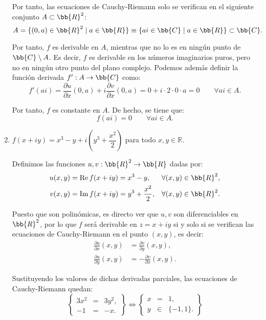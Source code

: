 \begin{ejercicio}
\begin{enumerate}
        Por tanto, las ecuaciones de Cauchy-Riemann solo se verifican en el siguiente conjunto $A\subset \bb{R}^2$:
        \[
            A = \{(0,a)\in\bb{R}^2\mid a\in\bb{R}\}\equiv
            \{ai\in\bb{C}\mid a\in\bb{R}\}\subset \bb{C}.
        \]
        
        Por tanto, $f$ es derivable en $A$, mientras que no lo es en ningún punto de $\bb{C}\setminus A$. Es decir, $f$ es derivable en los números imaginarios puros, pero no en ningún otro punto del plano complejo.
        Podemos además definir la función derivada $f':A\to\bb{C}$ como:
        \[
            f'(ai) = \dfrac{\partial u}{\partial x}(0,a) + i\dfrac{\partial v}{\partial x}(0,a) = 0+i\cdot 2\cdot 0 \cdot a = 0\qquad \forall ai\in A.
        \]

        Por tanto, $f$ es constante en $A$. De hecho, se tiene que:
        \[
            f(ai) = 0\qquad \forall ai\in A.
        \]



        \item $f(x + iy) = x^3 - y + i\left(y^3 + \dfrac{x^2}{2}\right)$ para todo $x, y \in \mathbb{R}$.
        
        Definimos las funciones $u,v:\bb{R}^2\to\bb{R}$ dadas por:
        \begin{align*}
            u(x,y) &= \Re f(x+iy) = x^3 - y,&\forall (x,y)\in\bb{R}^2,\\
            v(x,y) &= \Im f(x+iy) = y^3 + \frac{x^2}{2},&\forall (x,y)\in\bb{R}^2.
        \end{align*}

        Puesto que son polinómicas, es directo ver que $u,v$ son diferenciables en $\bb{R}^2$, por lo que $f$ será derivable en $z=x+iy$ si y solo si se verifican las ecuaciones de Cauchy-Riemann en el punto $(x,y)$, es decir:
        \begin{align*}
            \frac{\partial u}{\partial x}(x,y) &= \frac{\partial v}{\partial y}(x,y),\\
            \frac{\partial u}{\partial y}(x,y) &= -\frac{\partial v}{\partial x}(x,y).
        \end{align*}

        Sustituyendo los valores de dichas derivadas parciales, las ecuaciones de Cauchy-Riemann quedan:
        \begin{equation*}
            \left\{
                \begin{array}{rcl}
                    3x^2 &=& 3y^2,\\
                    -1 &=& -x.
                \end{array}
            \right\}
            \iff
            \left\{
                \begin{array}{rcl}
                    x &=& 1,\\
                    y &\in& \{-1,1\}.
                \end{array}
            \right\}
        \end{equation*}


\end{enumerate}
\end{ejercicio}
